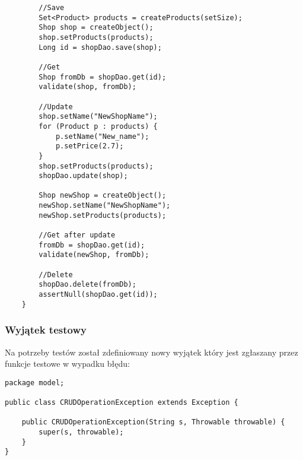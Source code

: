 \documentclass[a4paper,11pt,notitlepage]{article}
\begin{document}
\begin{itemize}
\begin{footnotesize}
\begin{verbatim}
        //Save
        Set<Product> products = createProducts(setSize);
        Shop shop = createObject();
        shop.setProducts(products);
        Long id = shopDao.save(shop);

        //Get
        Shop fromDb = shopDao.get(id);
        validate(shop, fromDb);

        //Update
        shop.setName("NewShopName");
        for (Product p : products) {
            p.setName("New_name");
            p.setPrice(2.7);
        }
        shop.setProducts(products);
        shopDao.update(shop);

        Shop newShop = createObject();
        newShop.setName("NewShopName");
        newShop.setProducts(products);

        //Get after update
        fromDb = shopDao.get(id);
        validate(newShop, fromDb);

        //Delete
        shopDao.delete(fromDb);
        assertNull(shopDao.get(id));
    }
\end{verbatim}\end{footnotesize}
\end{itemize}
\subsubsection{Wyjątek testowy}
Na potrzeby testów został zdefiniowany nowy wyjątek który jest zgłaszany przez funkcje testowe w wypadku błędu:
\begin{footnotesize}\begin{verbatim}
package model;

public class CRUDOperationException extends Exception {

    public CRUDOperationException(String s, Throwable throwable) {
        super(s, throwable);
    }
}
\end{verbatim}\end{footnotesize}
\end{document}

